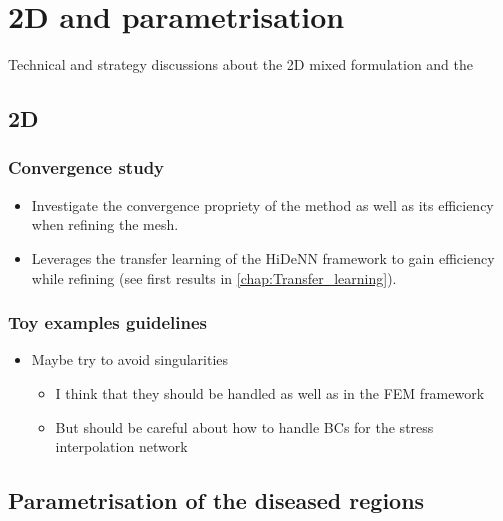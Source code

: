 \chapter[The 29$^{\text{th}}$ of March 2024 - 2D and parametrisation]{2D and parametrisation}


\begin{chapabstract}
	Technical and strategy discussions about the 2D mixed formulation and the 
\end{chapabstract}


\minitoc



\section{2D}

\subsection{Convergence study}

\begin{itemize}
	\item Investigate the convergence propriety of the method as well as its efficiency when refining the mesh.
	\item Leverages the transfer learning of the HiDeNN framework to gain efficiency while refining (see first results in \cref{chap:Transfer_learning}).
\end{itemize}

\subsection{Toy examples guidelines}

\begin{itemize}
	\item Maybe try to avoid singularities
	\begin{itemize}
		\item I think that they should be handled as well as in the FEM framework
		\item But should be careful about how to handle BCs for the stress interpolation network
	\end{itemize}
\end{itemize}


\section{Parametrisation of the diseased regions}

